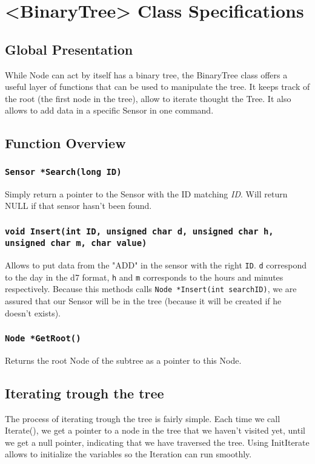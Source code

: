 \documentclass[10pt]{article}
\begin{document}
\section{<BinaryTree> Class Specifications}
\subsection{Global Presentation}
While Node can act by itself has a binary tree, the BinaryTree class offers a useful layer of functions that can be used to manipulate the tree. It keeps track of the root (the first node in the tree), allow to iterate thought the Tree. It also allows to add data in a specific Sensor in one command.

\subsection{Function Overview}
\subsubsection*{\tt Sensor *Search(long ID)}
Simply return a pointer to the Sensor with the ID matching \emph{ID}. Will return NULL if that sensor hasn't been found.

\subsubsection*{\tt void Insert(int ID, 
				unsigned char d,
				unsigned char h,
				unsigned char m,
				char value)}

Allows to put data from the "ADD" in the sensor with the right \texttt{ID}. \texttt d correspond to the day in the d7 format, \texttt h and \texttt m corresponds to the hours and minutes respectively. Because this methods calls {\tt Node *Insert(int searchID)}, we are assured that our Sensor will be in the tree (because it will be created if he doesn't exists).

\subsubsection*{\tt Node *GetRoot()}
Returns the root Node of the subtree as a pointer to this Node.

\subsection{Iterating trough the tree}
The process of iterating trough the tree is fairly simple. Each time we call Iterate(), we get a pointer to a node in the tree that we haven’t visited yet, until we get a null pointer, indicating that we have traversed the tree. Using InitIterate allows to initialize the variables so the Iteration can run smoothly.
\end{document}
